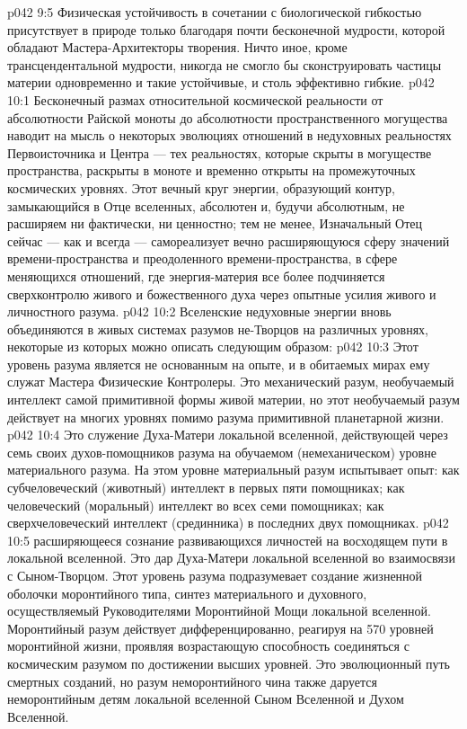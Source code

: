 \vs p042 9:5 Физическая устойчивость в сочетании с биологической гибкостью присутствует в природе только благодаря почти бесконечной мудрости, которой обладают Мастера\hyp{}Архитекторы творения. Ничто иное, кроме трансцендентальной мудрости, никогда не смогло бы сконструировать частицы материи одновременно и такие устойчивые, и столь эффективно гибкие.
\vs p042 10:1 Бесконечный размах относительной космической реальности от абсолютности Райской моноты до абсолютности пространственного могущества наводит на мысль о некоторых эволюциях отношений в недуховных реальностях Первоисточника и Центра --- тех реальностях, которые скрыты в могуществе пространства, раскрыты в моноте и временно открыты на промежуточных космических уровнях. Этот вечный круг энергии, образующий контур, замыкающийся в Отце вселенных, абсолютен и, будучи абсолютным, не расширяем ни фактически, ни ценностно; тем не менее, Изначальный Отец сейчас --- как и всегда --- самореализует вечно расширяющуюся сферу значений времени\hyp{}пространства и преодоленного времени\hyp{}пространства, в сфере меняющихся отношений, где энергия\hyp{}материя все более подчиняется сверхконтролю живого и божественного духа через опытные усилия живого и личностного разума.
\vs p042 10:2 Вселенские недуховные энергии вновь объединяются в живых системах разумов не\hyp{}Творцов на различных уровнях, некоторые из которых можно описать следующим образом:
\vs p042 10:3 \pc {}\bibnobreakspace {} Этот уровень разума является не основанным на опыте, и в обитаемых мирах ему служат Мастера Физические Контролеры. Это механический разум, необучаемый интеллект самой примитивной формы живой материи, но этот необучаемый разум действует на многих уровнях помимо разума примитивной планетарной жизни.
\vs p042 10:4 \pc {}\bibnobreakspace {} Это служение Духа\hyp{}Матери локальной вселенной, действующей через семь своих духов\hyp{}помощников разума на обучаемом (немеханическом) уровне материального разума. На этом уровне материальный разум испытывает опыт: как субчеловеческий (животный) интеллект в первых пяти помощниках; как человеческий (моральный) интеллект во всех семи помощниках; как сверхчеловеческий интеллект (срединника) в последних двух помощниках.
\vs p042 10:5 \pc {}\bibnobreakspace {} расширяющееся сознание развивающихся личностей на восходящем пути в локальной вселенной. Это дар Духа\hyp{}Матери локальной вселенной во взаимосвязи с Сыном\hyp{}Творцом. Этот уровень разума подразумевает создание жизненной оболочки моронтийного типа, синтез материального и духовного, осуществляемый Руководителями Моронтийной Мощи локальной вселенной. Моронтийный разум действует дифференцированно, реагируя на 570 уровней моронтийной жизни, проявляя возрастающую способность соединяться с космическим разумом по достижении высших уровней. Это эволюционный путь смертных созданий, но разум неморонтийного чина также даруется неморонтийным детям локальной вселенной Сыном Вселенной и Духом Вселенной.
